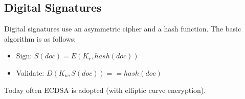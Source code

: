 \documentclass[10pt,a4paper]{report}
\begin{document}
\subsection{Digital Signatures}
Digital signatures use an asymmetric cipher and a hash function. The basic algorithm is as follows:
\begin{itemize}
\item Sign: $S(doc) = E(K_r, hash(doc))$
\item Validate: $D(K_u, S(doc)) == hash(doc)$
\end{itemize}
Today often ECDSA is adopted (with elliptic curve encryption).
\end{document}
